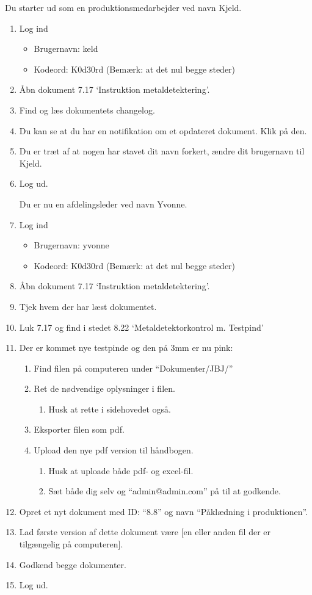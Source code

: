 Du starter ud som en produktionsmedarbejder ved navn Kjeld.
\begin{enumerate}
	\item Log ind
		\begin{itemize}
			\item Brugernavn: keld
			\item Kodeord: K0d30rd  (Bemærk: at det nul begge steder)
		\end{itemize}
	\item Åbn dokument 7.17 ‘Instruktion metaldetektering’.
	\item Find og læs dokumentets changelog.
	\item Du kan se at du har en notifikation om et opdateret dokument. Klik på den.
	\item Du er træt af at nogen har stavet dit navn forkert, ændre dit brugernavn til Kjeld.
	\item Log ud.

Du er nu en afdelingsleder ved navn Yvonne.
	\item Log ind
		\begin{itemize}
			\item Brugernavn: yvonne
			\item Kodeord: K0d30rd  (Bemærk: at det nul begge steder)
		\end{itemize}
	\item Åbn dokument 7.17 ‘Instruktion metaldetektering’.
	\item Tjek hvem der har læst dokumentet.
	\item Luk 7.17 og find i stedet 8.22 ‘Metaldetektorkontrol m. Testpind’
	\item Der er kommet nye testpinde og den på 3mm er nu pink:
		\begin{enumerate}
			\item Find filen på computeren under “Dokumenter/JBJ/”
			\item Ret de nødvendige oplysninger i filen.
			\begin{enumerate}
				\item Husk at rette i sidehovedet også.
			\end{enumerate}
		\item Eksporter filen som pdf.
		\item Upload den nye pdf version til håndbogen. 
			\begin{enumerate}
				\item Husk at uploade både pdf- og excel-fil.
				\item Sæt både dig selv og “admin@admin.com” på til at godkende.
			\end{enumerate}
		\end{enumerate}
	\item Opret et nyt dokument med ID: “8.8” og navn “Påklædning i produktionen”.
	\item Lad første version af dette dokument være [en eller anden fil der er tilgængelig på computeren].
	\item Godkend begge dokumenter.
	\item Log ud.


\end{enumerate}
